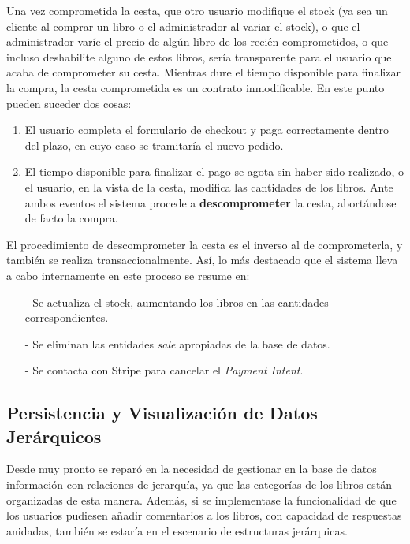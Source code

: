 \documentclass[a4paper]{article}
\begin{document}
    Una vez comprometida la cesta, que otro usuario modifique el stock (ya sea un cliente al comprar un libro o el administrador al variar el stock), o que el administrador varíe el precio de algún libro de los recién comprometidos, o que incluso deshabilite alguno de estos libros, sería transparente para el usuario que acaba de comprometer su cesta. Mientras dure el tiempo disponible para finalizar la compra, la cesta comprometida es un contrato inmodificable. En este punto pueden suceder dos cosas: 
    
    \begin{enumerate}
    	\item El usuario completa el formulario de checkout y paga correctamente dentro del plazo, en cuyo caso se tramitaría el nuevo pedido.
    	\item El tiempo disponible para finalizar el pago se agota sin haber sido realizado, o el usuario, en la vista de la cesta, modifica las cantidades de los libros. Ante ambos eventos el sistema procede a \textbf{descomprometer} la cesta, abortándose de facto la compra.
    \end{enumerate}
    
    El procedimiento de descomprometer la cesta es el inverso al de comprometerla, y también se realiza transaccionalmente. Así, lo más destacado que el sistema lleva a cabo internamente en este proceso se resume en:
    
    \begin{itemize}
    	\item[-] Se actualiza el stock, aumentando los libros en las cantidades correspondientes.
    	\item[-] Se eliminan las entidades \emph{sale} apropiadas de la base de datos.
    	\item[-] Se contacta con Stripe para cancelar el \emph{Payment Intent}.
    \end{itemize}

    \subsection[Datos Jerárquicos]{Persistencia y Visualización de Datos Jerárquicos} \label{sec:hierarchy}
    Desde muy pronto se reparó en la necesidad de gestionar en la base de datos información con relaciones de jerarquía, ya que las categorías de los libros están organizadas de esta manera. Además, si se implementase la funcionalidad de que los usuarios pudiesen añadir comentarios a los libros, con capacidad de respuestas anidadas, también se estaría en el escenario de estructuras jerárquicas.
    
\end{document}
